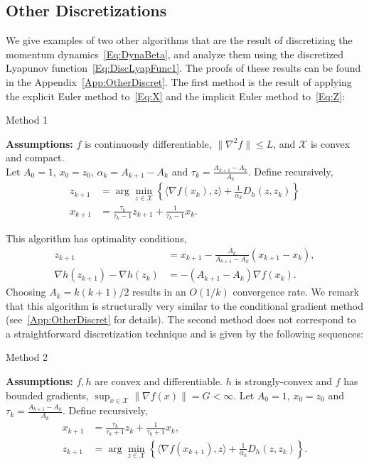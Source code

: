 \documentclass[11pt]{article}
\theoremstyle{plain}
\newcommand{\X}{{\mathcal X}}
\begin{document}
\subsection{Other Discretizations}
We give examples of two other algorithms that are the result of discretizing the momentum dynamics~\eqref{Eq:DynaBeta}, and analyze them using the discretized Lyapunov function~\eqref{Eq:DiscLyapFunc1}. The proofs of these results can be found in the Appendix~\ref{App:OtherDiscret}. The first method is the result of applying the explicit Euler method to~\eqref{Eq:X} and the implicit Euler method to~\eqref{Eq:Z}:
\begin{algorithm}[H]
\caption{Method 1}
{\bf Assumptions:} $f$ is continuously differentiable, $\|\nabla^2 f\|\leq L$, and $\X$ is convex and compact. \\
Let $A_0 = 1$, $x_0 = z_0$, $\alpha_k = A_{k+1} - A_k$ and $\tau_k = \frac{A_{k+1}- A_k}{A_{k}}$. Define recursively,
\begin{subequations}\label{Eq:QuasiSub2}
\begin{align}
z_{k+1} &= \arg \min_{z \in \X} \left\{\langle \nabla f(x_k),z \rangle + \frac{1}{\alpha_k} D_h(z, z_k)\right\}\\
x_{k+1} &= \frac{\tau_k}{\tau_k - 1}z_{k+1} + \frac{1}{\tau_k - 1}  x_k.
\end{align} 
\end{subequations}
\end{algorithm}
\noindent This algorithm has optimality conditions,
\begin{subequations}
\begin{align}
z_{k+1} &= x_{k+1} - \frac{A_{k}}{A_{k+1} -A_{k}} (x_{k+1} - x_k),\label{Eq:ZSeqOther1}\\
\nabla h(z_{k+1}) -\nabla h(z_k) &= -(A_{k+1} - A_{k})\nabla f(x_{k}) \label{Eq:XSeqOther1}.
\end{align}
\end{subequations}
\noindent Choosing $A_k = k(k+1)/2$ results in an $O(1/k)$ convergence rate. We remark that  this algorithm is structurally very similar to the conditional gradient method (see~\ref{App:OtherDiscret} for details). The second method does not correspond to a straightforward discretization technique and is given by the following sequences:
\begin{algorithm}[H]
\caption{Method 2}
{\bf Assumptions:} $f, h$ are convex and differentiable. $h$ is strongly-convex and $f$ has bounded gradients, $\sup_{x\in\X}\|\nabla f(x)\| = G <\infty$. 
Let $A_0 = 1$, $x_0 = z_0$ and $\tau_k = \frac{A_{k+1}- A_k}{A_{k}}$. Define recursively,
\begin{subequations}\label{Eq:QuasiSub3}
\begin{align}
x_{k+1}  &= \frac{\tau_k}{\tau_k + 1} z_k + \frac{1}{\tau_k+1}x_k,\\%
z_{k+1} &= \arg \min_{z \in \X} \left\{\langle \nabla f(x_{k+1}),z\rangle + \frac{1}{\alpha_k} D_h(z, z_k)\right\}.
\end{align} 
\end{subequations}
\end{algorithm}
\end{document}
